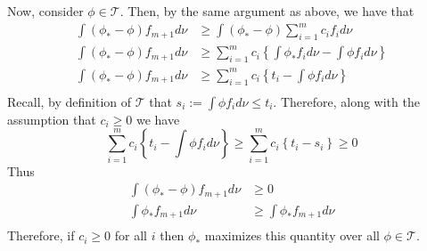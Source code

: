 \documentclass[12pt]{article}  %
\begin{document}
\begin{enumerate}
Now, consider $\phi\in\mathcal{T}$. Then, by the same argument as above, we have that 
\begin{align*}
\int(\phi_* - \phi)f_{m+1}d\nu &\geq \int(\phi_* - \phi)\sum_{i = 1}^m c_if_id\nu\\
\int(\phi_* - \phi)f_{m+1}d\nu &\geq \sum_{i = 1}^m c_i\left\{\int\phi_*f_id\nu - \int\phi f_id\nu\right\}\\
\int(\phi_* - \phi)f_{m+1}d\nu &\geq \sum_{i = 1}^m c_i\left\{t_i - \int\phi f_id\nu\right\}\\
\end{align*}
Recall, by definition of $\mathcal{T}$ that $s_i:=\int\phi f_id\nu\leq t_i$. Therefore, along with the assumption that $c_i\geq 0$ we have 
$$\sum_{i = 1}^m c_i\left\{t_i - \int\phi f_id\nu\right\}\geq \sum_{i = 1}^m c_i\left\{t_i - s_i\right\}\geq 0$$ Thus 
\begin{align*}
\int(\phi_* - \phi)f_{m+1}d\nu &\geq 0\\
\int\phi_*f_{m+1}d\nu &\geq \int\phi_*f_{m+1}d\nu\\
\end{align*}
Therefore, if $c_i\geq 0$ for all $i$ then $\phi_*$ maximizes this quantity over all $\phi\in\mathcal{T}$. 

\end{enumerate}	
\end{document}
